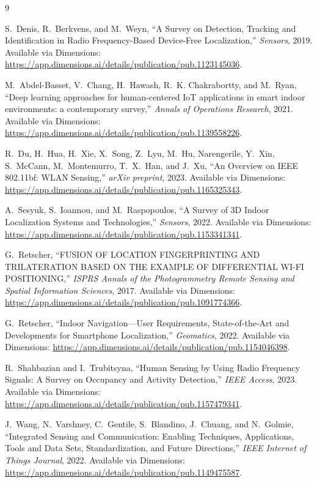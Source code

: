 \documentclass[11pt,a4paper]{article}
\begin{document}
\begin{thebibliography}{9}

S.~Denis, R.~Berkvens, and M.~Weyn,
``A Survey on Detection, Tracking and Identification in Radio Frequency-Based Device-Free Localization,''
\textit{Sensors}, 2019.
Available via Dimensions: \url{https://app.dimensions.ai/details/publication/pub.1123145036}.

M.~Abdel-Basset, V.~Chang, H.~Hawash, R.~K. Chakrabortty, and M.~Ryan,
``Deep learning approaches for human-centered IoT applications in smart indoor environments: a contemporary survey,''
\textit{Annals of Operations Research}, 2021.
Available via Dimensions: \url{https://app.dimensions.ai/details/publication/pub.1139558226}.

R.~Du, H.~Hua, H.~Xie, X.~Song, Z.~Lyu, M.~Hu, Narengerile, Y.~Xin, S.~McCann, M.~Montemurro, T.~X.~Han, and J.~Xu,
``An Overview on IEEE 802.11bf: WLAN Sensing,''
\textit{arXiv preprint}, 2023.
Available via Dimensions: \url{https://app.dimensions.ai/details/publication/pub.1165325343}.

A.~Sesyuk, S.~Ioannou, and M.~Raspopoulos,
``A Survey of 3D Indoor Localization Systems and Technologies,''
\textit{Sensors}, 2022.
Available via Dimensions: \url{https://app.dimensions.ai/details/publication/pub.1153341341}.

G.~Retscher,
``FUSION OF LOCATION FINGERPRINTING AND TRILATERATION BASED ON THE EXAMPLE OF DIFFERENTIAL WI-FI POSITIONING,''
\textit{ISPRS Annals of the Photogrammetry Remote Sensing and Spatial Information Sciences}, 2017.
Available via Dimensions: \url{https://app.dimensions.ai/details/publication/pub.1091774366}.

G.~Retscher,
``Indoor Navigation—User Requirements, State-of-the-Art and Developments for Smartphone Localization,''
\textit{Geomatics}, 2022.
Available via Dimensions: \url{https://app.dimensions.ai/details/publication/pub.1154046398}.

R.~Shahbazian and I.~Trubitsyna,
``Human Sensing by Using Radio Frequency Signals: A Survey on Occupancy and Activity Detection,''
\textit{IEEE Access}, 2023.
Available via Dimensions: \url{https://app.dimensions.ai/details/publication/pub.1157479341}.

J.~Wang, N.~Varshney, C.~Gentile, S.~Blandino, J.~Chuang, and N.~Golmie,
``Integrated Sensing and Communication: Enabling Techniques, Applications, Tools and Data Sets, Standardization, and Future Directions,''
\textit{IEEE Internet of Things Journal}, 2022.
Available via Dimensions: \url{https://app.dimensions.ai/details/publication/pub.1149475587}.

\end{thebibliography}
\end{document}
